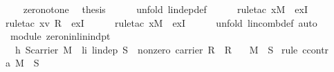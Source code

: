 \begin{isabellebody}
\ \ \isamarkupfalse%
\ {}\ zero{\isacharunderscore}not{\isacharunderscore}one\ \isamarkupfalse%
\ {\isacharquery}thesis\isanewline
\ \ \ \ \isamarkupfalse%
\ {\isacharparenleft}unfold\ lin{\isacharunderscore}dep{\isacharunderscore}def{\isacharparenright}\isanewline
\ \ \ \ \isamarkupfalse%
\ {\isacharparenleft}rule{\isacharunderscore}tac\ x{\isacharequal}{\isachardoublequoteopen}{\isacharbraceleft}{\isasymzero}\isactrlbsub M\isactrlesub {\isacharbraceright}{\isachardoublequoteclose}\ \ exI{\isacharparenright}\isanewline
\ \ \ \ \isamarkupfalse%
\ {\isacharparenleft}rule{\isacharunderscore}tac\ x{\isacharequal}{\isachardoublequoteopen}{\isacharparenleft}{\isasymlambda}v{\isachardot}\ {\isasymone}\isactrlbsub R\isactrlesub {\isacharparenright}{\isachardoublequoteclose}\ \ exI{\isacharparenright}\isanewline
\ \ \ \ \isamarkupfalse%
\ {\isacharparenleft}rule{\isacharunderscore}tac\ x{\isacharequal}{\isachardoublequoteopen}{\isasymzero}\isactrlbsub M\isactrlesub {\isachardoublequoteclose}\ \ exI{\isacharparenright}\isanewline
\ \ \ \ \isamarkupfalse%
\ {\isacharparenleft}unfold\ lincomb{\isacharunderscore}def{\isacharcomma}\ auto{\isacharparenright}\isanewline
{}\isamarkupfalse%
%
\endisatagproof
{\isafoldproof}%
%
\isadelimproof
\isanewline
%
\endisadelimproof
\isanewline
{}\isamarkupfalse%
\ {\isacharparenleft}\ module{\isacharparenright}\ zero{\isacharunderscore}nin{\isacharunderscore}lin{\isacharunderscore}indpt{\isacharcolon}\ \isanewline
\ \ \ h{}{\isacharcolon}\ {\isachardoublequoteopen}S{\isasymsubseteq}carrier\ M{\isachardoublequoteclose}\ \ li{\isacharcolon}\ {\isachardoublequoteopen}{\isasymnot}{\isacharparenleft}lin{\isacharunderscore}dep\ S{\isacharparenright}{\isachardoublequoteclose}\ \ nonzero{\isacharcolon}\ {\isachardoublequoteopen}carrier\ R\ {\isasymnoteq}\ {\isacharbraceleft}{\isasymzero}\isactrlbsub R\isactrlesub {\isacharbraceright}{\isachardoublequoteclose}\isanewline
\ \ \ {\isachardoublequoteopen}{\isasymzero}\isactrlbsub M\isactrlesub \ {\isasymnotin}\ S{\isachardoublequoteclose}\isanewline
%
\isadelimproof
%
\endisadelimproof
%
\isatagproof
{}\isamarkupfalse%
\ {\isacharparenleft}rule\ ccontr{\isacharparenright}\isanewline
\ \ \isamarkupfalse%
\ a{}{\isacharcolon}\ {\isachardoublequoteopen}{\isasymnot}{\isacharparenleft}{\isasymzero}\isactrlbsub M\isactrlesub \ {\isasymnotin}\ S{\isacharparenright}{\isachardoublequoteclose}\isanewline

\end{isabellebody}
